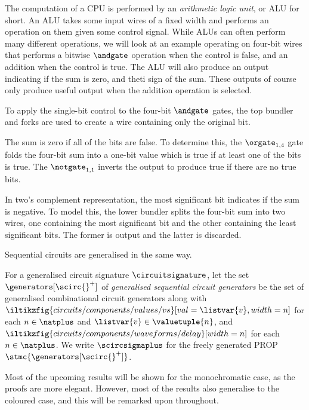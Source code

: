 \begin{example}[ALU]
    The computation of a CPU is performed by an \emph{arithmetic logic unit},
    or ALU for short.
    An ALU takes some input wires of a fixed width and performs an operation
    on them given some control signal.
    While ALUs can often perform many different operations, we will look at an
    example operating on four-bit wires that performs a bitwise \(\andgate\)
    operation when the control is false, and an addition when the control is
    true.
    The ALU will also produce an output indicating if the sum is zero, and theti
    sign of the sum.
    These outputs of course only produce useful output when the addition
    operation is selected.

    \begin{center}
    \end{center}

    To apply the single-bit control to the four-bit \(\andgate\) gates, the
    top bundler and forks are used to create a wire containing only the
    original bit.

    The sum is zero if all of the bits are false.
    To determine this, the \(\orgate_{1,4}\) gate folds the four-bit sum into
    a one-bit value which is true if at least one of the bits is true.
    The \(\notgate_{1,1}\) inverts the output to produce true if there are no
    true bits.

    In two's complement representation, the most significant bit indicates if
    the sum is negative.
    To model this, the lower bundler splits the four-bit sum into two
    wires, one containing the most significant bit and the other containing the
    least significant bits.
    The former is output and the latter is discarded.
\end{example}

Sequential circuits are generalised in the same way.

\begin{definition}
    For a generalised circuit signature \(\circuitsignature\), let the set
    \(\generators[\scirc{}^+]\) of
    \emph{generalised sequential circuit generators} be the set of
    generalised combinational circuit generators along with
    \(
    \iltikzfig{circuits/components/values/vs}[val=\listvar{v},width=n]
    \) for each \(n \in \natplus\) and \(\listvar{v} \in \valuetuple{n}\), and
    \(
    \iltikzfig{circuits/components/waveforms/delay}[width=n]
    \) for each \(n \in \natplus\).
    We write \(\scircsigmaplus\) for the freely generated PROP
    \(\stmc{\generators[\scirc{}^+]}\).
\end{definition}

Most of the upcoming results will be shown for the monochromatic case, as the
proofs are more elegant.
However, most of the results also generalise to the coloured case, and this will
be remarked upon throughout.

